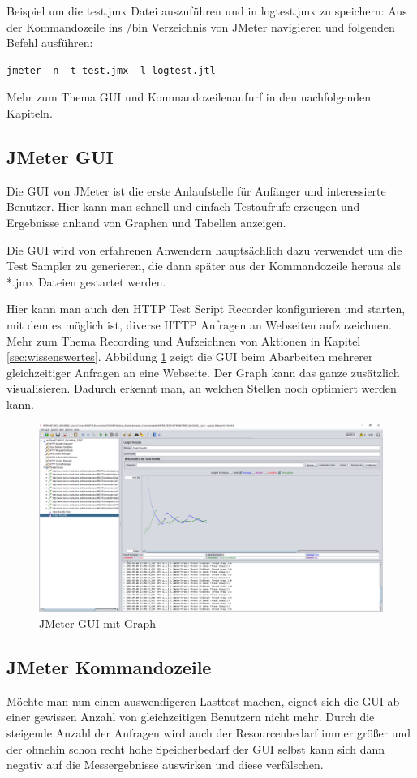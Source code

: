 \documentclass[a4paper,12pt]{article}
\begin{document}
Beispiel um die test.jmx Datei auszuführen und in logtest.jmx zu speichern: Aus der Kommandozeile ins /bin Verzeichnis von JMeter navigieren und folgenden Befehl ausführen: \
\begin{lstlisting}
jmeter -n -t test.jmx -l logtest.jtl
\end{lstlisting}
Mehr zum Thema GUI und Kommandozeilenaufurf in den nachfolgenden Kapiteln.

\subsection{JMeter GUI}
Die GUI von JMeter ist die erste Anlaufstelle für Anfänger und interessierte Benutzer. Hier kann man schnell und einfach Testaufrufe erzeugen und Ergebnisse anhand von Graphen und Tabellen anzeigen. 

Die GUI wird von erfahrenen Anwendern hauptsächlich dazu verwendet um die Test Sampler zu generieren, die dann später aus der Kommandozeile heraus als *.jmx Dateien gestartet werden.

Hier kann man auch den HTTP Test Script Recorder konfigurieren und starten, mit dem es möglich ist, diverse HTTP Anfragen an Webseiten aufzuzeichnen. Mehr zum Thema Recording und Aufzeichnen von Aktionen in Kapitel \ref{sec:wissenswertes}. Abbildung \ref{fig:gui_graph} zeigt die GUI beim Abarbeiten mehrerer gleichzeitiger Anfragen an eine Webseite. Der Graph kann das ganze zusätzlich visualisieren. Dadurch erkennt man, an welchen Stellen noch  optimiert werden kann.

\begin{figure}[htb]%
 \centering
    \includegraphics[width=1\textwidth]{bilder/jmeter_2.png}
  \caption{JMeter GUI mit Graph}
  \label{fig:gui_graph}
\end{figure}

\subsection{JMeter Kommandozeile}
\label{chap:jmeter_commandline}
Möchte man nun einen auswendigeren Lasttest machen, eignet sich die GUI ab einer gewissen Anzahl von gleichzeitigen Benutzern nicht mehr. Durch die steigende Anzahl der Anfragen wird auch der Resourcenbedarf immer größer und der ohnehin schon recht hohe Speicherbedarf der GUI selbst kann sich dann negativ auf die Messergebnisse auswirken und diese verfälschen.
\end{document}
